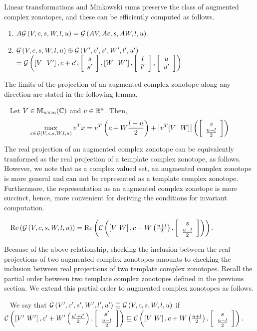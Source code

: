Linear transformations and Minkowski sums preserve the class of
augmented complex zonotopes, and these can be efficiently computed as
follows.
%
\begin{lemma}
\begin{enumerate}
\item $A\mathcal{G}\left(V,c,s,W,l,u\right) = \mathcal{G}\left(AV,Ac,s,AW,l,u\right)$.
\item $\mathcal{G}\left(V,c,s,W,l,u\right)\oplus
  \mathcal{G}\left(V^\prime,c^\prime,s^\prime,W^\prime,l^\prime,u^\prime\right)$\\
$= \mathcal{G}\left(\left[V~~V^\prime\right],c+c^\prime,\left[\begin{array}{c}{s}\\{s^\prime} \end{array}\right],\left[W~~W^\prime\right],\left[\begin{array}{c}{l}\\{l^\prime} \end{array}\right],\left[\begin{array}{c}{u}\\{u^\prime} \end{array}\right]\right)$
\end{enumerate}
\end{lemma}
%
The limits of the projection of an augmented complex zonotope along
any direction are stated in the following lemma.
%
\begin{lemma}~\label{lem:polylimits-acz}
Let $V\in\mathbb{M}_{n\times m}(\mathbb{\mathbb{C}})$ and $v\in\mathbb{R}^n$.  Then,
\[
\max_{x\in\mathcal{G}\left(V,c,s,W,l,u\right)}v^Tx = v^T\left(c+W\frac{l+u}{2}\right)+\left|v^T[V~~W]\right|\left(\left[\begin{array}{c}{s}\\{\frac{u-l}{2}} \end{array}\right]\right)
\]
\end{lemma}
%
The real projection of an augmented complex zonotope can be
equivalently tranformed as the real projection of a template complex
zonotope, as follows.  However, we note that as a complex valued set,
an augmented complex zonotope is more general and can not be
represented as a template complex zonotope.  Furthermore, the
representation as an augmented complex zonotope is more succinct,
hence, more convenient for deriving the conditions for invariant
computation.
%
\begin{lemma}~\label{lem:conversion}
$\operatorname{\operatorname{Re}}\left(\mathcal{G}\left(V,c,s,W,l,u\right)\right) = \operatorname{\operatorname{Re}}\left(\mathcal{C}\left(\left[V~W\right],c+W\left(\frac{u+l}{2}\right),\left[\begin{array}{c}{s}\\{\frac{u-l}{2}} \end{array}\right]\right)\right)$.
\end{lemma}
%
Because of the above relationship, checking the inclusion between the
real projections of two augmented complex zonotopes amounts to
checking the inclusion between real projections of two template
complex zonotopes.  Recall the partial order between two template
complex zonotopes defined in the previous section. We extend this
partial order to augmented complex zonotopes as follows.
%
\begin{definition}~\label{defn:gcz-order}
We say that $\mathcal{G}\left(V^\prime,c^\prime,s^\prime,W^\prime,l^\prime,u^\prime\right)\sqsubseteq
\mathcal{G}\left(V,c,s,W,l,u\right)$ if\\ $\mathcal{C}\left(\left[V^\prime~W^\prime\right],c^\prime+W^\prime\left(\frac{u^\prime+l^\prime}{2}\right),\left[\begin{array}{c}{s^\prime}\\{\frac{u-l}{2}} \end{array}\right]\right)
\sqsubseteq
\mathcal{C}\left(\left[V~W\right],c+W\left(\frac{u+l}{2}\right),\left[\begin{array}{c}{s}\\{\frac{u-l}{2}} \end{array}\right]\right).$
\end{definition}
